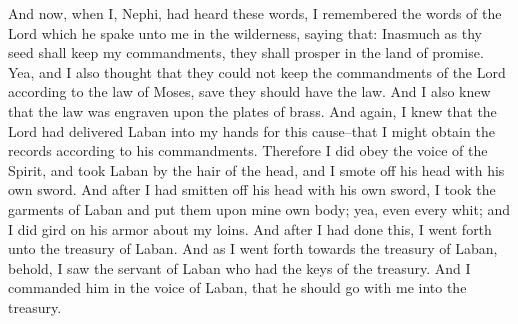 \bverse \iffalse And now, when I, Nephi, had heard these words, I remembered the words of the Lord which he spake unto me in the wilderness, saying that: Inasmuch as thy seed shall keep my commandments, they shall prosper in the land of promise. \fi
And now, when I, Nephi, had heard these words, I remembered the words of the Lord which he spake unto me in the wilderness, saying that: Inasmuch as thy seed shall keep my commandments, they shall prosper in the land of promise.
\bverse \iffalse Yea, and I also thought that they could not keep the commandments of the Lord according to the law of Moses, save they should have the law. \fi
Yea, and I also thought that they could not keep the commandments of the Lord according to the law of Moses, save they should have the law.
\bverse \iffalse And I also knew that the law was engraven upon the plates of brass. \fi
And I also knew that the law was engraven upon the plates of brass.
\bverse \iffalse And again, I knew that the Lord had delivered Laban into my hands for this cause--that I might obtain the records according to his commandments. \fi
And again, I knew that the Lord had delivered Laban into my hands for this cause--that I might obtain the records according to his commandments.
\bverse \iffalse Therefore I did obey the voice of the Spirit, and took Laban by the hair of the head, and I smote off his head with his own sword. \fi
Therefore I did obey the voice of the Spirit, and took Laban by the hair of the head, and I smote off his head with his own sword.
\bverse \iffalse And after I had smitten off his head with his own sword, I took the garments of Laban and put them upon mine own body; yea, even every whit; and I did gird on his armor about my loins. \fi
And after I had smitten off his head with his own sword, I took the garments of Laban and put them upon mine own body; yea, even every whit; and I did gird on his armor about my loins.
\bverse \iffalse And after I had done this, I went forth unto the treasury of Laban. And as I went forth towards the treasury of Laban, behold, I saw the servant of Laban who had the keys of the treasury. And I commanded him in the voice of Laban, that he should go with me into the treasury. \fi
And after I had done this, I went forth unto the treasury of Laban. And as I went forth towards the treasury of Laban, behold, I saw the servant of Laban who had the keys of the treasury. And I commanded him in the voice of Laban, that he should go with me into the treasury.

